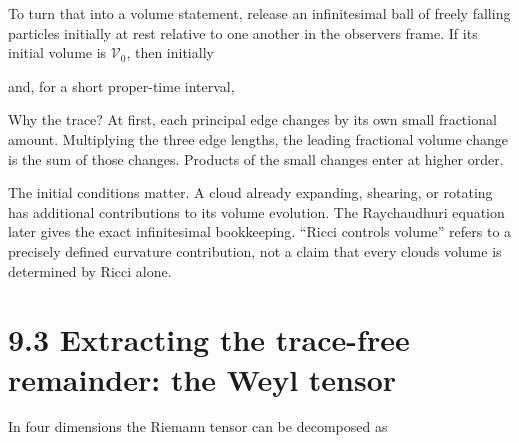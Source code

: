 \documentclass[
  11pt,
  letterpaper,
  oneside,
  openany]{scrbook}
\begin{document}
To turn that into a volume statement, release an infinitesimal ball of
freely falling particles initially at rest relative to one another in
the observer\textquotesingle s frame. If its initial volume is
\(\mathcal V_0\), then initially

\begin{center}
\begingroup
{}
\ifdim\wd\grmathbox>\linewidth
\resizebox{\linewidth}{!}{\usebox{\grmathbox}}
\else\usebox{\grmathbox}\fi
\endgroup
\end{center}

and, for a short proper-time interval,

\begin{center}
\begingroup
{}
\ifdim\wd\grmathbox>\linewidth
\resizebox{\linewidth}{!}{\usebox{\grmathbox}}
\else\usebox{\grmathbox}\fi
\endgroup
\end{center}

Why the trace? At first, each principal edge changes by its own small
fractional amount. Multiplying the three edge lengths, the leading
fractional volume change is the sum of those changes. Products of the
small changes enter at higher order.

The initial conditions matter. A cloud already expanding, shearing, or
rotating has additional contributions to its volume evolution. The
Raychaudhuri equation later gives the exact infinitesimal bookkeeping.
``Ricci controls volume'' refers to a precisely defined curvature
contribution, not a claim that every cloud\textquotesingle s volume is
determined by Ricci alone.

\hypertarget{extracting-the-trace-free-remainder-the-weyl-tensor}{%
\section{9.3 Extracting the trace-free remainder: the Weyl
tensor}\label{extracting-the-trace-free-remainder-the-weyl-tensor}}

In four dimensions the Riemann tensor can be decomposed as

\begin{center}
\begingroup
{}
\ifdim\wd\grmathbox>\linewidth
\resizebox{\linewidth}{!}{\usebox{\grmathbox}}
\else\usebox{\grmathbox}\fi
\endgroup
\end{center}
\end{document}
